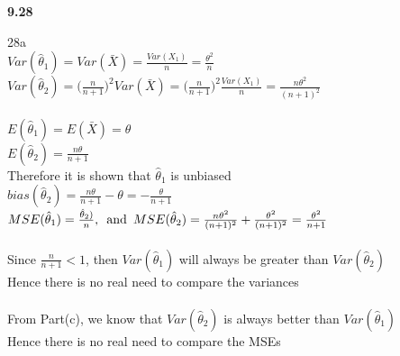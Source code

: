 {\bf 9.28}

{28a}\\

$Var(\hat{\theta}_1) = Var(\bar{X}) = \frac{Var(X_1)}{n} = \frac{\theta ^2}{n}$\\

$Var(\hat{\theta}_2) = \Big( \frac{n}{n+1} \Big)^2 Var(\bar{X}) = \Big( \frac{n}{n+1} \Big)^2 \frac{Var(X_1)}{n} = \frac{n\theta^2}{(n+1)^2}$\\

\\

$E(\hat{\theta}_1) = E(\bar{X}) = \theta$\\

$E(\hat{\theta}_2) = \frac{n\theta}{n+1}$\\

Therefore it is shown that $\hat{\theta}_1$ is unbiased\\

$bias(\hat{\theta}_2) = \frac{n\theta}{n+1} - \theta = -\frac{\theta}{n+1}$\\

$MSE(\hat{\theta}_1) = \frac{\hat{\theta}_2)}{n}, \enskip \text{and} \enskip MSE(\hat{\theta}_2) = \frac{n\theta ^2}{(n+1)^2} + \frac{\theta ^2}{(n+1)^2} = \frac{\theta ^2}{n+1}$\\

\\

Since $ \frac{n}{n+1} < 1$, then $Var(\hat{\theta}_1)$ will always be greater than $Var(\hat{\theta}_2)$\\

Hence there is no real need to compare the variances\\

\\

From Part(c), we know that $Var(\hat{\theta}_2)$ is always better than $Var(\hat{\theta}_1)$\\

Hence there is no real need to compare the MSEs\\
